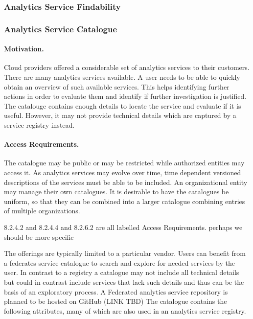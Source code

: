 \documentclass[12pt]{article}
\begin{document}
\subsubsection{Analytics Service Findability}



\subsubsection{Analytics Service Catalogue}

\paragraph{Motivation.} Cloud providers offered a considerable set of analytics services to their customers. There are many analytics services available. A user needs to be able to quickly obtain an overview of such available services. This helps identifying further actions in order to evaluate them and identify if further investigation is justified. The catalouge contains enough details to locate the service and evaluate if it is useful. However, it may not provide technical details which are captured by a service registry instead.

\paragraph{Access Requirements.} The catalogue may be public or may be restricted while authorized entities may access it. As analytics services may evolve over time, time dependent versioned descriptions of the services must be able to be included. An organizational entity may manage their own catalogues. It is desirable to have the catalogues be uniform, so that they can be combined into a larger catalogue combining entries of multiple organizations. 

8.2.4.2 and 8.2.4.4 and 8.2.6.2 are all labelled Access Requirements. perhaps we should be more specific

 The offerings are typically limited to a particular vendor. Users can benefit from a federates service catalogue  to search and explore for needed services by the user. In contrast to a registry a catalogue may not include all technical details but could in contrast include services that lack such details and thus can be the basis of an exploratory process.  A Federated analytics service repository is planned to be hosted on GitHub (LINK TBD)
The catalogue contains the following attributes, many of which are also used in an analytics service registry.
\end{document}
